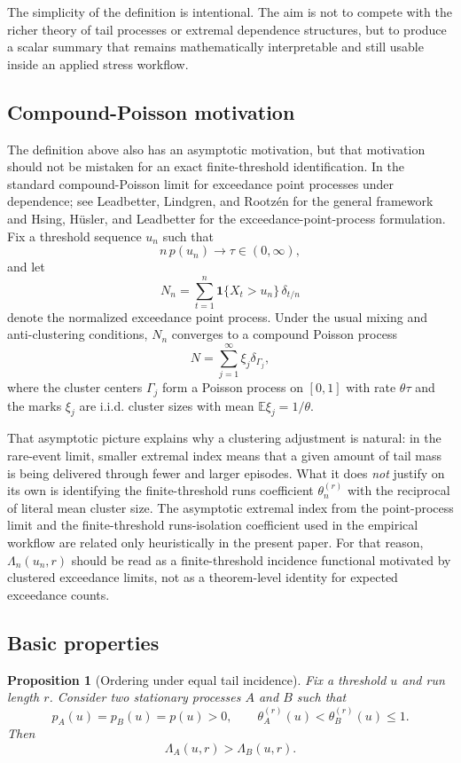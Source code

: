 \documentclass[11pt]{article}
\newtheorem{proposition}{Proposition}
\begin{document}
The simplicity of the definition is intentional. The aim is not to compete with the richer theory of tail processes or extremal dependence structures, but to produce a scalar summary that remains mathematically interpretable and still usable inside an applied stress workflow.

\subsection{Compound-Poisson motivation}

The definition above also has an asymptotic motivation, but that motivation should not be mistaken for an exact finite-threshold identification. In the standard compound-Poisson limit for exceedance point processes under dependence; see Leadbetter, Lindgren, and Rootz\'en \cite{leadbetter1983} for the general framework and Hsing, H\"usler, and Leadbetter \cite{hsing1988} for the exceedance-point-process formulation. Fix a threshold sequence $u_n$ such that
\[
n\,p(u_n)\to \tau \in (0,\infty),
\]
and let
\[
N_n=\sum_{t=1}^n \mathbf{1}\{X_t>u_n\}\,\delta_{t/n}
\]
denote the normalized exceedance point process. Under the usual mixing and anti-clustering conditions, $N_n$ converges to a compound Poisson process
\[
N=\sum_{j=1}^{\infty}\xi_j \delta_{\Gamma_j},
\]
where the cluster centers $\Gamma_j$ form a Poisson process on $[0,1]$ with rate $\theta\tau$ and the marks $\xi_j$ are i.i.d. cluster sizes with mean $\mathbb{E}\xi_j=1/\theta$.

That asymptotic picture explains why a clustering adjustment is natural: in the rare-event limit, smaller extremal index means that a given amount of tail mass is being delivered through fewer and larger episodes. What it does \emph{not} justify on its own is identifying the finite-threshold runs coefficient $\theta_n^{(r)}$ with the reciprocal of literal mean cluster size. The asymptotic extremal index from the point-process limit and the finite-threshold runs-isolation coefficient used in the empirical workflow are related only heuristically in the present paper. For that reason, $\Lambda_n(u_n,r)$ should be read as a finite-threshold incidence functional motivated by clustered exceedance limits, not as a theorem-level identity for expected exceedance counts.

\subsection{Basic properties}

\begin{proposition}[Ordering under equal tail incidence]
Fix a threshold $u$ and run length $r$. Consider two stationary processes $A$ and $B$ such that
\[
p_A(u)=p_B(u)=p(u)>0,
\qquad
\theta_A^{(r)}(u)<\theta_B^{(r)}(u)\le 1.
\]
Then
\[
\Lambda_A(u,r)>\Lambda_B(u,r).
\]
\end{proposition}
\end{document}
